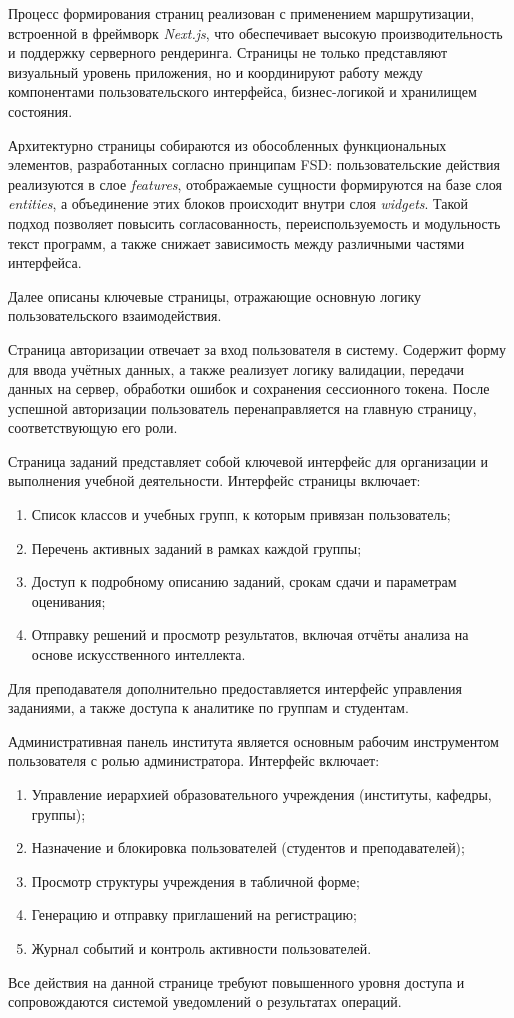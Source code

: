 Процесс формирования страниц реализован с применением маршрутизации, встроенной в фреймворк \textit{Next.js}, что обеспечивает высокую производительность и поддержку серверного рендеринга. Страницы не только представляют визуальный уровень приложения, но и координируют работу между компонентами пользовательского интерфейса, бизнес-логикой и хранилищем состояния.

Архитектурно страницы собираются из обособленных функциональных элементов, разработанных согласно принципам FSD: пользовательские действия реализуются в слое \textit{features}, отображаемые сущности формируются на базе слоя \textit{entities}, а объединение этих блоков происходит внутри слоя \textit{widgets}. Такой подход позволяет повысить согласованность, переиспользуемость и модульность текст программ, а также снижает зависимость между различными частями интерфейса.

Далее описаны ключевые страницы, отражающие основную логику пользовательского взаимодействия.

Страница авторизации отвечает за вход пользователя в систему. Содержит форму для ввода учётных данных, а также реализует логику валидации, передачи данных на сервер, обработки ошибок и сохранения сессионного токена. После успешной авторизации пользователь перенаправляется на главную страницу, соответствующую его роли.

Страница заданий представляет собой ключевой интерфейс для организации и выполнения учебной деятельности. Интерфейс страницы включает:
\begin{enumerate}
\item Список классов и учебных групп, к которым привязан пользователь;
\item Перечень активных заданий в рамках каждой группы;
\item Доступ к подробному описанию заданий, срокам сдачи и параметрам оценивания;
\item Отправку решений и просмотр результатов, включая отчёты анализа на основе искусственного интеллекта.
\end{enumerate}
Для преподавателя дополнительно предоставляется интерфейс управления заданиями, а также доступа к аналитике по группам и студентам.

Административная панель института является основным рабочим инструментом пользователя с ролью администратора. Интерфейс включает:
\begin{enumerate}
\item Управление иерархией образовательного учреждения (институты, кафедры, группы);
\item Назначение и блокировка пользователей (студентов и преподавателей);
\item Просмотр структуры учреждения в табличной форме;
\item Генерацию и отправку приглашений на регистрацию;
\item Журнал событий и контроль активности пользователей.
\end{enumerate}
Все действия на данной странице требуют повышенного уровня доступа и сопровождаются системой уведомлений о результатах операций.

